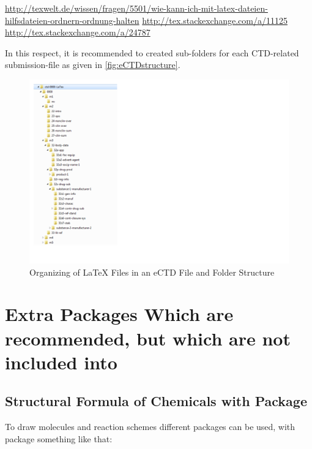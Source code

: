 \url{http://texwelt.de/wissen/fragen/5501/wie-kann-ich-mit-latex-dateien-hilfsdateien-ordnern-ordnung-halten}
\url{http://tex.stackexchange.com/a/11125}
\url{http://tex.stackexchange.com/a/24787}

In this respect, it is recommended to created sub-folders for each CTD-related submission-file as given in \autoref{fig:eCTDstructure}.
\begin{figure}[hbpt]
\centering
\includegraphics[width=1.5\linewidth]{LatexCTD}
\caption{Organizing of \LaTeX{} Files in an eCTD File and Folder Structure}
\label{fig:eCTDstructure}
\end{figure}


\section{Extra Packages Which are recommended, but which are not included into \PharmRep}
\subsection{Structural Formula of Chemicals with Package }
To draw molecules and reaction schemes different packages can be used, \eg with package 
something like that:
\bigskip


\bigskip

